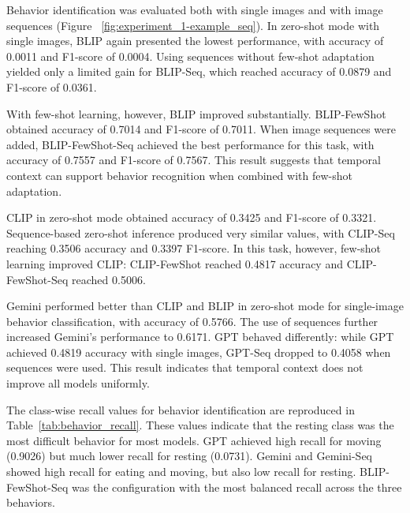 Behavior identification was evaluated both with single images and with image sequences (Figure ~\ref{fig:experiment_1-example_seq}). In zero-shot mode with single images, BLIP again presented the lowest performance, with accuracy of 0.0011 and F1-score of 0.0004. Using sequences without few-shot adaptation yielded only a limited gain for BLIP-Seq, which reached accuracy of 0.0879 and F1-score of 0.0361.

With few-shot learning, however, BLIP improved substantially. BLIP-FewShot obtained accuracy of 0.7014 and F1-score of 0.7011. When image sequences were added, BLIP-FewShot-Seq achieved the best performance for this task, with accuracy of 0.7557 and F1-score of 0.7567. This result suggests that temporal context can support behavior recognition when combined with few-shot adaptation.

CLIP in zero-shot mode obtained accuracy of 0.3425 and F1-score of 0.3321. Sequence-based zero-shot inference produced very similar values, with CLIP-Seq reaching 0.3506 accuracy and 0.3397 F1-score. In this task, however, few-shot learning improved CLIP: CLIP-FewShot reached 0.4817 accuracy and CLIP-FewShot-Seq reached 0.5006.

Gemini performed better than CLIP and BLIP in zero-shot mode for single-image behavior classification, with accuracy of 0.5766. The use of sequences further increased Gemini's performance to 0.6171. GPT behaved differently: while GPT achieved 0.4819 accuracy with single images, GPT-Seq dropped to 0.4058 when sequences were used. This result indicates that temporal context does not improve all models uniformly.

The class-wise recall values for behavior identification are reproduced in Table~\ref{tab:behavior_recall}. These values indicate that the resting class was the most difficult behavior for most models. GPT achieved high recall for moving (0.9026) but much lower recall for resting (0.0731). Gemini and Gemini-Seq showed high recall for eating and moving, but also low recall for resting. BLIP-FewShot-Seq was the configuration with the most balanced recall across the three behaviors.

